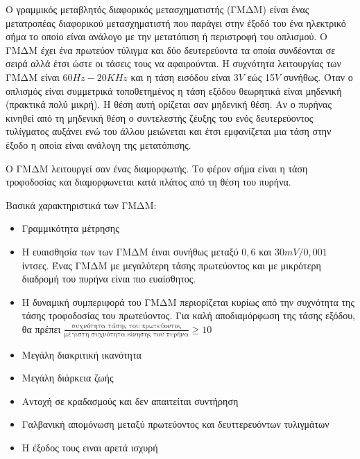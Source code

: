 \documentclass{article}
\begin{document}
Ο γραμμικός μεταβλητός διαφορικός μετασχηματιστής (ΓΜΔΜ) είναι ένας μετατροπέας διαφορικού μετασχηματιστή που παράγει στην έξοδό του ένα ηλεκτρικό σήμα το οποίο είναι ανάλογο με την 
μετατόπιση ή περιστροφή του οπλισμού. Ο ΓΜΔΜ έχει ένα πρωτεύον τύλιγμα και δύο δευτερεύοντα τα οποία συνδέονται σε σειρά αλλά έτσι ώστε οι τάσεις τους να αφαιρούνται. Η συχνότητα 
λειτουργίας των ΓΜΔΜ είναι $60Hz-20KHz$ και η τάση εισόδου είναι 3$V$ εώς 15$V$ συνήθως. Όταν ο οπλισμός είναι συμμετρικά τοποθετημένος η τάση εξόδου θεωρητικά είναι μηδενική (πρακτικά
πολύ μικρή). Η θέση αυτή ορίζεται σαν μηδενική θέση. Αν ο πυρήνας κινηθεί από τη μηδενική θέση ο συντελεστής ζέυξης του ενός δευτερεύοντος τυλίγματος αυξάνει ενώ του άλλου 
μειώνεται και έτσι εμφανίζεται μια τάση στην έξοδο η οποία είναι ανάλογη της μετατόπισης.

O ΓΜΔΜ λειτουργεί σαν ένας διαμορφωτής. Το φέρον σήμα είναι η τάση τροφοδοσίας και διαμορφωνεται κατά πλάτος από τη θέση του πυρήνα. 

Βασικά χαρακτηριστικά των ΓΜΔΜ: 

\begin{itemize}
    \item Γραμμικότητα μέτρησης
    \item Η ευαισθησία των των ΓΜΔΜ έιναι συνήθως μεταξύ $0,6$ και $30mV/0,001$ ίντσες. Ένας ΓΜΔΜ με μεγαλύτερη τάσης πρωτεύοντος και με μικρότερη διαδρομή του πυρήνα είναι πιο ευαίσθητος.
    \item Η δυναμική συμπεριφορά του ΓΜΔΜ περιορίζεται κυρίως από την συχνότητα της τάσης τροφοδοσίας του πρωτεύοντος. Για καλή αποδιαμόρφωση της τάσης εξόδου, θα πρέπει
        \newline$\frac{\text{συχνότητα τάσης του πρωτεύοντος}}{\text{μέγιστη συχνότητα κίνησης του πυρήνα}}\geq 10$
    \item Μεγάλη διακριτική ικανότητα
    \item Μεγάλη διάρκεια ζωής
    \item Αντοχή σε κραδασμούς και δεν απαιτείται συντήρηση
    \item Γαλβανική απομόνωση μεταξύ πρωτεύοντος και δευττερευόντων τυλιγμάτων
    \item Η έξοδος τους ειναι αρετά ισχυρή
\end{itemize}
\end{document}

